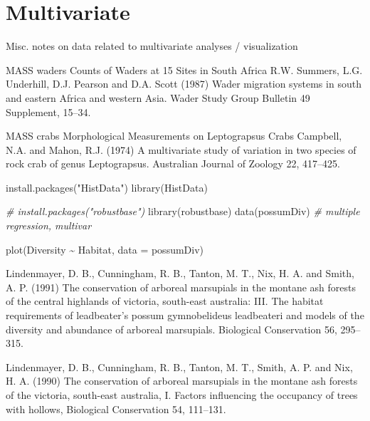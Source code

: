 \documentclass[
]{book}
\newenvironment{Shaded}{\begin{snugshade}}{\end{snugshade}}
\newcommand{\AttributeTok}[1]{\textcolor[rgb]{0.77,0.63,0.00}{#1}}
\newcommand{\CommentTok}[1]{\textcolor[rgb]{0.56,0.35,0.01}{\textit{#1}}}
\newcommand{\FunctionTok}[1]{\textcolor[rgb]{0.00,0.00,0.00}{#1}}
\newcommand{\NormalTok}[1]{#1}
\newcommand{\SpecialCharTok}[1]{\textcolor[rgb]{0.00,0.00,0.00}{#1}}
\newcommand{\StringTok}[1]{\textcolor[rgb]{0.31,0.60,0.02}{#1}}
\begin{document}
\hypertarget{multivariate}{%
\chapter{Multivariate}\label{multivariate}}

Misc. notes on data related to multivariate analyses / visualization

MASS waders Counts of Waders at 15 Sites in South Africa
R.W. Summers, L.G. Underhill, D.J. Pearson and D.A. Scott (1987) Wader migration systems in south and eastern Africa and western Asia. Wader Study Group Bulletin 49 Supplement, 15--34.

MASS crabs Morphological Measurements on Leptograpsus Crabs
Campbell, N.A. and Mahon, R.J. (1974) A multivariate study of variation in two species of rock crab of genus Leptograpsus. Australian Journal of Zoology 22, 417--425.

\begin{Shaded}
\begin{Highlighting}[]
\FunctionTok{install.packages}\NormalTok{(}\StringTok{"HistData"}\NormalTok{)}
\FunctionTok{library}\NormalTok{(HistData) }
\end{Highlighting}
\end{Shaded}

\begin{Shaded}
\begin{Highlighting}[]
\CommentTok{\# install.packages("robustbase")}
\FunctionTok{library}\NormalTok{(robustbase)}
\FunctionTok{data}\NormalTok{(possumDiv) }\CommentTok{\# multiple regression, multivar}

\FunctionTok{plot}\NormalTok{(Diversity }\SpecialCharTok{\textasciitilde{}}\NormalTok{ Habitat, }\AttributeTok{data =}\NormalTok{ possumDiv)}
\end{Highlighting}
\end{Shaded}

Lindenmayer, D. B., Cunningham, R. B., Tanton, M. T., Nix, H. A. and Smith, A. P. (1991) The conservation of arboreal marsupials in the montane ash forests of the central highlands of victoria, south-east australia: III. The habitat requirements of leadbeater's possum gymnobelideus leadbeateri and models of the diversity and abundance of arboreal marsupials. Biological Conservation 56, 295--315.

Lindenmayer, D. B., Cunningham, R. B., Tanton, M. T., Smith, A. P. and Nix, H. A. (1990) The conservation of arboreal marsupials in the montane ash forests of the victoria, south-east australia, I. Factors influencing the occupancy of trees with hollows, Biological Conservation 54, 111--131.
\end{document}
